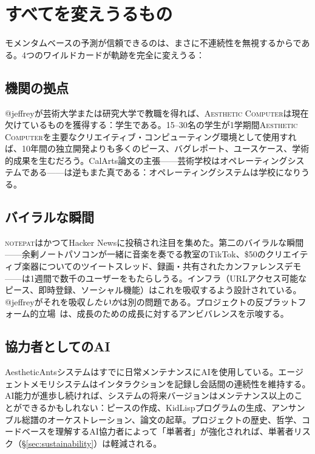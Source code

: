 \documentclass[10pt,letterpaper,twocolumn]{article}
\newcommand{\ac}{\textsc{Aesthetic Computer}}
\newcommand{\np}{\textsc{notepat}}
\begin{document}
\section{すべてを変えうるもの}
\label{sec:wildcards}

モメンタムベースの予測が信頼できるのは、まさに不連続性を無視するからである。4つのワイルドカードが軌跡を完全に変えうる：

\subsection{機関の拠点}

@jeffreyが芸術大学または研究大学で教職を得れば、\ac{}は現在欠けているものを獲得する：学生である。15--30名の学生が1学期間\ac{}を主要なクリエイティブ・コンピューティング環境として使用すれば、10年間の独立開発よりも多くのピース、バグレポート、ユースケース、学術的成果を生むだろう。CalArts論文の主張——芸術学校はオペレーティングシステムである——は逆もまた真である：オペレーティングシステムは学校になりうる。

\subsection{バイラルな瞬間}

\np{}はかつてHacker Newsに投稿され注目を集めた。第二のバイラルな瞬間——余剰ノートパソコンが一緒に音楽を奏でる教室のTikTok、\$50のクリエイティブ楽器についてのツイートスレッド、録画・共有されたカンファレンスデモ——は1週間で数千のユーザーをもたらしうる。インフラ（URLアクセス可能なピース、即時登録、ソーシャル機能）はこれを吸収するよう設計されている。@jeffreyがそれを吸収\emph{したいか}は別の問題である。プロジェクトの反プラットフォーム的立場~\citep{fisher2009capitalist}は、成長のための成長に対するアンビバレンスを示唆する。

\subsection{協力者としてのAI}

AestheticAntsシステムはすでに日常メンテナンスにAIを使用している。エージェントメモリシステムはインタラクションを記録し会話間の連続性を維持する。AI能力が進歩し続ければ、システムの将来バージョンはメンテナンス以上のことができるかもしれない：ピースの作成、KidLispプログラムの生成、アンサンブル総譜のオーケストレーション、論文の起草。プロジェクトの歴史、哲学、コードベースを理解するAI協力者によって「単著者」が強化されれば、単著者リスク（\S\ref{sec:sustainability}）は軽減される。
\end{document}
